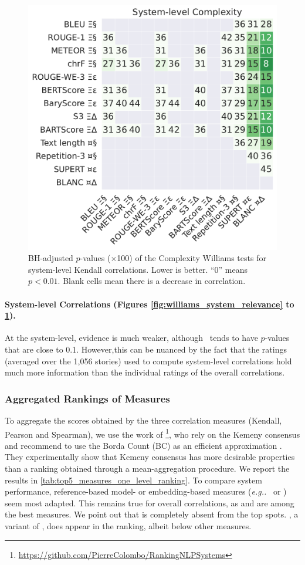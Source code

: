 \begin{figure}[h]
    \centering
    \includegraphics[width=0.62\columnwidth]{pictures/williams_system_kendall_Complexity.pdf}
    \caption{BH-adjusted $p$-values ($\times$100) of the Complexity Williams tests for system-level Kendall correlations. Lower is better. ``0'' means $p<0.01$. Blank cells mean there is a decrease in correlation.}
    \label{fig:williams_system_complexity}
\end{figure}

\clearpage

\paragraph{System-level Correlations (Figures \ref{fig:williams_system_relevance} to \ref{fig:williams_system_complexity}).}
At the system-level, evidence is much weaker, although \bary\ tends to have $p$-values that are close to 0.1. However,this can be nuanced by the fact that the ratings (averaged over the 1,056 stories) used to compute system-level correlations hold much more information than the individual ratings of the overall correlations.

\subsubsection{Aggregated Rankings of Measures}

To aggregate the scores obtained by the three correlation measures (Kendall, Pearson and Spearman), we use the work of \citet{colombo2022best}\footnote{\url{https://github.com/PierreColombo/RankingNLPSystems}}, who rely on the Kemeny consensus \citep{kemeny1959mathematics, myerson2013fundamentals} and recommend to use the Borda Count (BC) as an efficient approximation \citep{sibony2014borda}. They experimentally show that Kemeny consensus has more desirable properties than a ranking obtained through a mean-aggregation procedure. We report  the results in \autoref{tab:top5_measures_one_level_ranking}. To compare system performance, reference-based model- or embedding-based measures (\textit{e.g..}\ {\bartscore} or {\bertscore}) seem most adapted. This remains true for overall correlations, as {\bertscore} and {\sthree} are among the best measures. We point out that {\bleu} is completely absent from the top spots. {\rougewe}, a variant of {\rouge}, does appear in the ranking, albeit below other measures.

